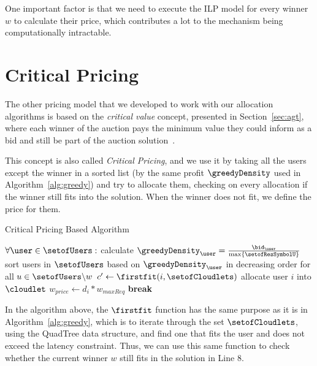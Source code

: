 \documentclass[English]{ic-tese-v3}
\begin{document}
One important factor is that we need to execute the ILP model for every winner $w$ to calculate their price, which contributes a lot to the mechanism being computationally intractable.

\section{Critical Pricing}
\label{sec:critical_pricing}
The other pricing model that we developed to work with our allocation algorithms is based on the \emph{critical value} concept, presented in Section~\ref{sec:agt}, where each winner of the auction pays the minimum value they could inform as a bid and still be part of the auction solution~\cite{Myerson1981}.

This concept is also called \emph{Critical Pricing}, and we use it by taking all the users except the winner in a sorted list (by the same profit $\greedyDensity$ used in Algorithm~\ref{alg:greedy}) and try to allocate them, checking on every allocation if the winner still fits into the solution. When the winner does not fit, we define the price for them.
\begin{algorithm}[H]
    \caption{Critical Pricing Based Algorithm}\label{alg:price}
    {\fontsize{9}{9}\selectfont
        \begin{algorithmic}[1]
                \State $\forall \user \in \setofUsers:$ calculate $\greedyDensity_{\user} = \frac{\bid_{\user}}{\max\{\setofResSymbolU\}}$
                \State sort users in $\setofUsers$ based on $\greedyDensity_{\user}$ in decreasing order for all $u \in \setofUsers \backslash w$
                    \State $c' \gets \firstfit(i, \setofCloudlets)$ 
                        \State allocate user $i$ into $\cloudlet$
                    \EndIf
                        \State $w_{price} \gets d_i * w_{maxReq}$
                        \State \textbf{break}
                    \EndIf
                \EndFor
            \EndFor
        \EndFunction
    \end{algorithmic}}
\end{algorithm}
In the algorithm above, the $\firstfit$ function has the same purpose as it is in Algorithm~\ref{alg:greedy}, which is to iterate through the set $\setofCloudlets$, using the QuadTree data structure, and find one that fits the user and does not exceed the latency constraint. Thus, we can use this same function to check whether the current winner $w$ still fits in the solution in Line $8$.
\end{document}
